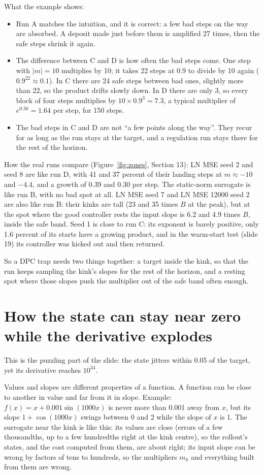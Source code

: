 \documentclass[11pt]{article}
\begin{document}
What the example shows:
\begin{itemize}
\item Run A matches the intuition, and it is correct: a few bad steps on the way are absorbed. A deposit made just before them is amplified 27 times, then the safe steps shrink it again.
\item The difference between C and D is how often the bad steps come. One step with $|m|=10$ multiplies by 10; it takes 22 steps at 0.9 to divide by 10 again ($0.9^{22}\approx0.1$). In C there are 24 safe steps between bad ones, slightly more than 22, so the product drifts slowly down. In D there are only 3, so every block of four steps multiplies by $10\times0.9^3=7.3$, a typical multiplier of $e^{0.50}=1.64$ per step, for 150 steps.
\item The bad steps in C and D are not ``a few points along the way''. They recur for as long as the run stays at the target, and a regulation run stays there for the rest of the horizon.
\end{itemize}

How the real runs compare (Figure~\ref{fig:zones}, Section 13): LN MSE seed 2 and seed 8 are like run D, with 41 and 37 percent of their landing steps at $m\approx-10$ and $-4.4$, and a growth of 0.39 and 0.30 per step. The static-norm surrogate is like run B, with no bad spot at all. LN MSE seed 7 and LN MSE 12000 seed 2 are also like run B: their kinks are tall (23 and 35 times $B$ at the peak), but at the spot where the good controller rests the input slope is 6.2 and 4.9 times $B$, inside the safe band. Seed 1 is close to run C: its exponent is barely positive, only 1.6 percent of its starts have a growing product, and in the warm-start test (slide 19) its controller was kicked out and then returned.

So a DPC trap needs two things together: a target inside the kink, so that the run keeps sampling the kink's slopes for the rest of the horizon, and a resting spot where those slopes push the multiplier out of the safe band often enough.

\section{How the state can stay near zero while the derivative explodes}

This is the puzzling part of the slide: the state jitters within 0.05 of the target, yet its derivative reaches $10^{34}$.

Values and slopes are different properties of a function. A function can be close to another in value and far from it in slope. Example: $f(x)=x+0.001\sin(1000x)$ is never more than 0.001 away from $x$, but its slope $1+\cos(1000x)$ swings between 0 and 2 while the slope of $x$ is 1. The surrogate near the kink is like this: its values are close (errors of a few thousandths, up to a few hundredths right at the kink centre), so the rollout's states, and the cost computed from them, are about right; its input slope can be wrong by factors of tens to hundreds, so the multipliers $m_k$ and everything built from them are wrong.
\end{document}
